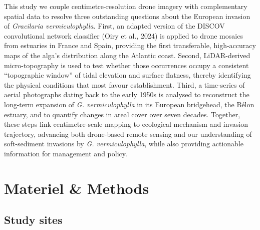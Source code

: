 \documentclass[
  letterpaper,
  DIV=11,
  numbers=noendperiod]{scrartcl}
\begin{document}
This study we couple centimetre-resolution drone imagery with
complementary spatial data to resolve three outstanding questions about
the European invasion of \emph{Gracilaria vermiculophylla}. First, an
adapted version of the DISCOV convolutional network classifier (Oiry et
al., 2024) is applied to drone mosaics from estuaries in France and
Spain, providing the first transferable, high-accuracy maps of the
alga's distribution along the Atlantic coast. Second, LiDAR-derived
micro-topography is used to test whether those occurrences occupy a
consistent ``topographic window'' of tidal elevation and surface
flatness, thereby identifying the physical conditions that most favour
establishment. Third, a time-series of aerial photographs dating back to
the early 1950s is analysed to reconstruct the long-term expansion of
\emph{G. vermiculophylla} in its European bridgehead, the Bélon estuary,
and to quantify changes in areal cover over seven decades. Together,
these steps link centimetre-scale mapping to ecological mechanism and
invasion trajectory, advancing both drone-based remote sensing and our
understanding of soft-sediment invasions by \emph{G. vermiculophylla},
while also providing actionable information for management and policy.

\section{Materiel \& Methods}\label{materiel-methods}

\subsection{Study sites}\label{study-sites}
\end{document}

